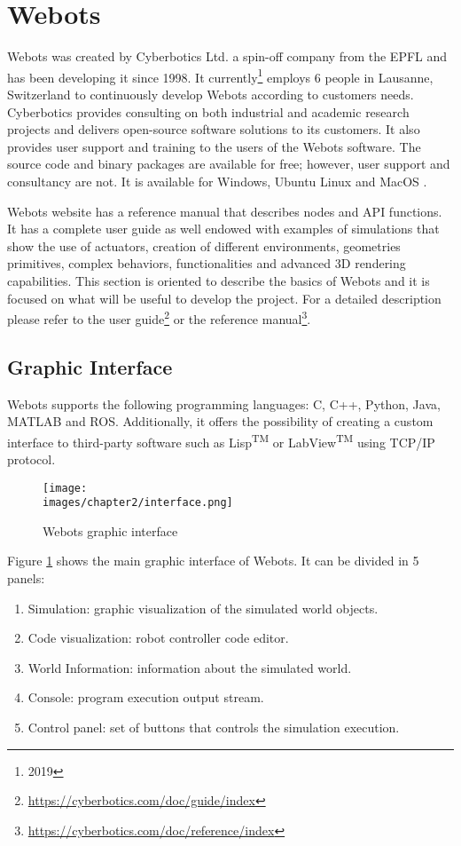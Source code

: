 \section{Webots}
Webots was created by Cyberbotics Ltd. a spin-off company from the EPFL and has been developing it since 1998. It currently\footnote{2019} employs 6 people in Lausanne, Switzerland to continuously develop Webots according to customers needs. Cyberbotics provides consulting on both industrial and academic research projects and delivers open-source software solutions to its customers. It also provides user support and training to the users of the Webots software. The source code and binary packages are available for free; however, user support and consultancy are not. It is available for Windows, Ubuntu Linux and MacOS \cite{cyberbotics}.

Webots website has a reference manual that describes nodes and API functions. It has a complete user guide as well endowed with examples of simulations that show the use of actuators, creation of different environments, geometries primitives, complex behaviors, functionalities and advanced 3D rendering capabilities. This section is oriented to describe the basics of Webots and it is focused on what will be useful to develop the project. For a detailed description please refer to the user guide\footnote{\url{https://cyberbotics.com/doc/guide/index}} or the reference manual\footnote{\url{https://cyberbotics.com/doc/reference/index}}.

\subsection{Graphic Interface}
Webots supports the following programming languages: C, C++, Python, Java, MATLAB and ROS. Additionally, it offers the possibility of creating a custom interface to third-party software such as Lisp\textsuperscript{TM} or LabView\textsuperscript{TM} using TCP/IP protocol.

\begin{figure}[h]
	\texttt{[image: \\images/chapter2/interface.png]}
	\caption{Webots graphic interface}
	\label{fig-ch-2:interface}
\end{figure}

Figure \ref{fig-ch-2:interface} shows the main graphic interface of Webots. It can be divided in 5 panels:

\begin{enumerate}
	\item Simulation: graphic visualization of the simulated world objects.
	\item Code visualization: robot controller code editor.
	\item World Information: information about the simulated world.
	\item Console: program execution output stream.
	\item Control panel: set of buttons that controls the simulation execution.
\end{enumerate}


